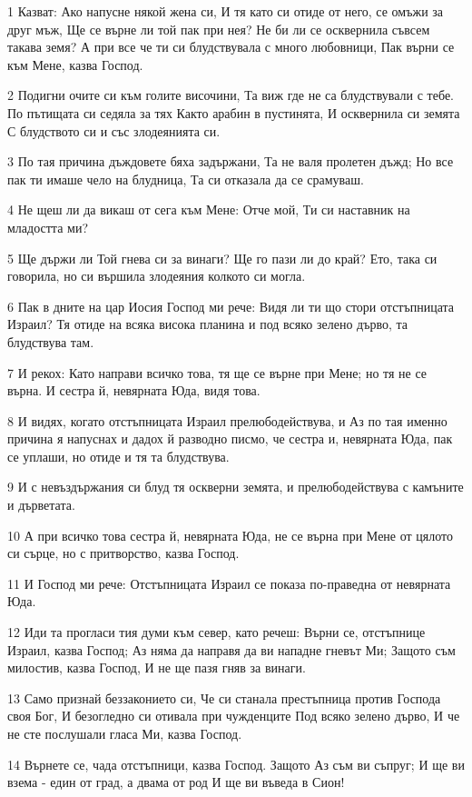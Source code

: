 \par 1 Казват: Ако напусне някой жена си, И тя като си отиде от него, се омъжи за друг мъж, Ще се върне ли той пак при нея? Не би ли се осквернила съвсем такава земя? А при все че ти си блудствувала с много любовници, Пак върни се към Мене, казва Господ.
\par 2 Подигни очите си към голите височини, Та виж где не са блудствували с тебе. По пътищата си седяла за тях Както арабин в пустинята, И осквернила си земята С блудството си и със злодеянията си.
\par 3 По тая причина дъждовете бяха задържани, Та не валя пролетен дъжд; Но все пак ти имаше чело на блудница, Та си отказала да се срамуваш.
\par 4 Не щеш ли да викаш от сега към Мене: Отче мой, Ти си наставник на младостта ми?
\par 5 Ще държи ли Той гнева си за винаги? Ще го пази ли до край? Ето, така си говорила, но си вършила злодеяния колкото си могла.
\par 6 Пак в дните на цар Иосия Господ ми рече: Видя ли ти що стори отстъпницата Израил? Тя отиде на всяка висока планина и под всяко зелено дърво, та блудствува там.
\par 7 И рекох: Като направи всичко това, тя ще се върне при Мене; но тя не се върна. И сестра й, невярната Юда, видя това.
\par 8 И видях, когато отстъпницата Израил прелюбодействува, и Аз по тая именно причина я напуснах и дадох й разводно писмо, че сестра и, невярната Юда, пак се уплаши, но отиде и тя та блудствува.
\par 9 И с невъздържания си блуд тя оскверни земята, и прелюбодействува с камъните и дърветата.
\par 10 А при всичко това сестра й, невярната Юда, не се върна при Мене от цялото си сърце, но с притворство, казва Господ.
\par 11 И Господ ми рече: Отстъпницата Израил се показа по-праведна от невярната Юда.
\par 12 Иди та прогласи тия думи към север, като речеш: Върни се, отстъпнице Израил, казва Господ; Аз няма да направя да ви нападне гневът Ми; Защото съм милостив, казва Господ, И не ще пазя гняв за винаги.
\par 13 Само признай беззаконието си, Че си станала престъпница против Господа своя Бог, И безогледно си отивала при чужденците Под всяко зелено дърво, И че не сте послушали гласа Ми, казва Господ.
\par 14 Върнете се, чада отстъпници, казва Господ. Защото Аз съм ви съпруг; И ще ви взема - един от град, а двама от род И ще ви въведа в Сион!
